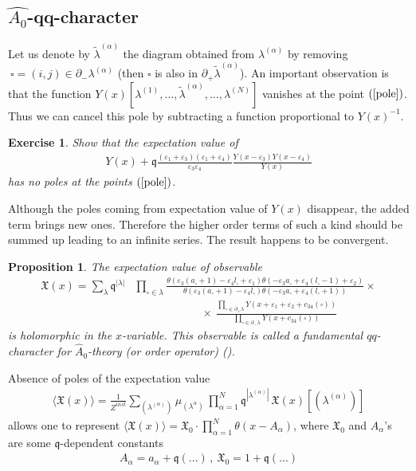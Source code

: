 \documentclass[12pt]{article}
\newtheorem{pr}{Proposition}[section]
\newtheorem{exer}{Exercise}[section]
\numberwithin{equation}{section}
\theoremstyle{definition}
\newcommand {\qe} {\mathfrak q}
\begin{document}
\subsection{$\widehat{A_{0}}$-qq-character}
Let us denote by $\tilde{\lambda}^{(\alpha)}$ the diagram obtained from $\lambda^{(\alpha)}$ by removing $~\square = (i, j) \in \partial_{-}\lambda^{(\alpha)}$ (then $\square$ is also in $\partial_{+}\tilde{\lambda}^{(\alpha)}$). An important observation is that the function $Y(x)[\lambda^{(1)}, \ldots , \tilde{\lambda}^{(\alpha)}, \ldots , \lambda^{(N)}]$ vanishes at the point $(\ref{pole})$. Thus we can cancel this pole by subtracting a function proportional to $Y(x)^{-1}$. 
\begin{exer}
    Show that the expectation value of 
\begin{align*}
     Y(x) + \mathfrak{q} \frac{(\varepsilon_1 + \varepsilon_3)(\varepsilon_1 + \varepsilon_4)}{\varepsilon_3 \varepsilon_4} \frac{Y(x - \varepsilon_3)Y(x - \varepsilon_4)}{Y(x)} 
\end{align*}
has no poles at the points $(\ref{pole})$.
\end{exer}
Although the poles coming from expectation value of $Y(x)$ disappear, the added term brings new ones. Therefore the higher order terms of such a kind should be summed up leading to an infinite series. The result happens to be convergent.
\begin{pr}
The expectation value of observable
    \begin{align}\label{qq}
    \mathfrak{X}(x) = \sum\limits_{\lambda} \mathfrak{q}^{|\lambda|} &\prod\limits_{\square \in \lambda} 
    \frac{\theta(\varepsilon_3 (a_{\square} + 1) - \varepsilon_4 l_{\square} + \varepsilon_1 )\theta(-\varepsilon_3 a_{\square} + \varepsilon_4 (l_{\square} - 1) + \varepsilon_2)}{\theta(\varepsilon_3 (a_{\square} + 1) - \varepsilon_4 l_{\square})\theta(-\varepsilon_3 a_{\square} + \varepsilon_4 (l_\square + 1))} \nonumber \times\\
    &\qquad\qquad\qquad \times\ \frac{\prod\limits_{\square \in \partial_{+} \lambda}Y(x + \varepsilon_1 + \varepsilon_2 + c_{34}(\square))}{\prod\limits_{\square \in \partial_{-}\lambda}Y(x + c_{34}(\square))}
\end{align}
is holomorphic in the $x$-variable. This observable is called a fundamental $qq$-character for $\hat{A}_{0}$-theory (or order operator) (\cite{Nekrasov2015BPSCFTCN}).
\end{pr}
Absence of poles of the expectation value
\begin{align*}
    \langle \mathfrak{X}(x) \rangle = \frac{1}{Z^{inst}}\sum\limits_{(\lambda^{(\alpha)})} \mu_{(\lambda^{\alpha})}\, \prod\limits_{\alpha  = 1}^{N} {\qe}^{|{\lambda}^{({\alpha})}|}\,  \mathfrak{X}(x)[(\lambda^{(\alpha)})]
\end{align*}
allows one to represent $\langle \mathfrak{X}(x) \rangle = {\mathfrak{X}}_{0} \cdot \prod\limits_{\alpha = 1}^{N} \theta(x - A_{\alpha})$, where ${\mathfrak{X}}_{0}$ and
$A_{\alpha}$'s are some $\mathfrak{q}$-dependent constants
\begin{align*}
    A_{\alpha} = a_{\alpha} + \mathfrak{q}(...) \, , \ {\mathfrak{X}}_{0} = 1 + {\qe} (...)
\end{align*}
\end{document}
